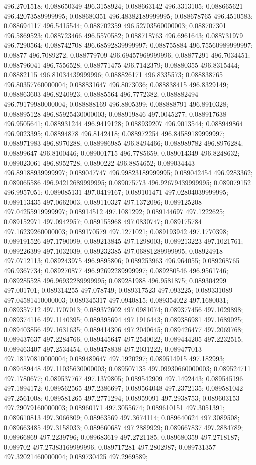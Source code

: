 496.2701518; 0.088650349 496.3158924; 0.088663142 496.3313105; 0.088665621 496.42073589999995; 0.088680351 496.48382189999995; 0.088678765 496.4510583; 0.088694117 496.5415544; 0.088702359 496.52703560000003; 0.088707301 496.5869523; 0.088723466 496.5570582; 0.088718763 496.6961643; 0.088731979 496.7290564; 0.088742708 496.68592839999997; 0.088755884 496.75560989999997; 0.08877 496.7089272; 0.088779709 496.69457969999996; 0.08877291 496.7034451; 0.088796041 496.7556528; 0.088771475 496.7142379; 0.08880355 496.8315444; 0.08882115 496.81034439999996; 0.088826171 496.8335573; 0.088838765 496.80357760000004; 0.088831647 496.8073036; 0.088838415 496.8329149; 0.088863603 496.8240923; 0.08885564 496.7772382; 0.088882494 496.79179980000004; 0.088888169 496.8805399; 0.088888791 496.8910328; 0.088895128 496.85925430000003; 0.088919846 497.0045277; 0.088917638 496.9505641; 0.088931244 496.9419128; 0.088939207 496.9013544; 0.088949864 496.9023395; 0.08894878 496.8142418; 0.088972254 496.84589189999997; 0.088971983 496.8970288; 0.088986985 496.8494466; 0.088989782 496.8976284; 0.08899647 496.8100446; 0.089001715 496.7785659; 0.089014349 496.8248632; 0.089023061 496.8952728; 0.0890222 496.8854652; 0.089034443 496.89188939999997; 0.089047747 496.99823189999995; 0.089042454 496.9283362; 0.089065586 496.94212689999995; 0.089075773 496.92679439999995; 0.089079152 496.9957051; 0.089085131 497.0419167; 0.089101471 497.02804039999995; 0.089113435 497.0662003; 0.089110327 497.1372096; 0.089125208 497.04255919999997; 0.08914512 497.1081292; 0.089144697 497.1222625; 0.089152971 497.0942957; 0.089155968 497.0830747; 0.089175784 497.16239260000003; 0.089170579 497.1271021; 0.089193942 497.1770398; 0.089191526 497.1790099; 0.089213845 497.1298003; 0.089213223 497.1021761; 0.089226399 497.1032039; 0.089232385 497.06881289999995; 0.08924918 497.0712113; 0.089243975 496.9895806; 0.089253963 496.964055; 0.089268765 496.9367734; 0.089270877 496.92692289999997; 0.089280546 496.9561746; 0.089285528 496.96932289999995; 0.089281988 496.9581875; 0.089304299 497.001701; 0.089314255 497.078749; 0.089317523 497.093225; 0.089331089 497.04581410000003; 0.089345317 497.0940815; 0.089354022 497.1680031; 0.089357712 497.1707013; 0.089372602 497.0981074; 0.089377456 497.1029898; 0.089374116 497.1140395; 0.089395694 497.1916443; 0.089386981 497.1689025; 0.089403856 497.1631635; 0.089414306 497.2040645; 0.089426477 497.2069768; 0.089437637 497.2284766; 0.089445647 497.2540022; 0.089444205 497.2232515; 0.089463407 497.2534454; 0.089478838 497.2031222; 0.089477013 497.18170810000004; 0.089489647 497.1920297; 0.089514915 497.182993; 0.089489448 497.11035630000003; 0.089507135 497.09930660000003; 0.089524711 497.1780677; 0.089537767 497.1379805; 0.089542909 497.1492443; 0.089545196 497.1894172; 0.089562565 497.2386697; 0.089564048 497.2372135; 0.089581042 497.2561008; 0.089581265 497.2771294; 0.08959091 497.2938753; 0.089603153 497.29079160000003; 0.08960171 497.3055674; 0.089610151 497.3051391; 0.089610813 497.3066809; 0.08963569 497.3674114; 0.089640624 497.3089508; 0.089663485 497.3158033; 0.089660687 497.2889929; 0.089667837 497.2884789; 0.08966869 497.2239796; 0.089683619 497.2721185; 0.089680359 497.2718187; 0.089702 497.27383169999996; 0.089717281 497.2802987; 0.089731357 497.32021460000004; 0.089730425 497.2969589; 
